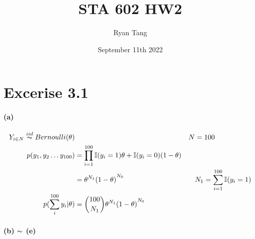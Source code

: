 \documentclass[11pt, letterpaper]{article}
\title{STA 602 HW2}
\author{Ryan Tang}
\date{September 11th 2022}
\begin{document}
\maketitle

\section{Excerise 3.1}
\paragraph{(a)}
\begin{align*}
    Y_{i\in N} \overset{iid}{\thicksim} Bernoulli(\theta) && N &= 100 \\
    p(y_1, y_2 \dots y_{100}) &= \prod_{i=1}^{100} \mathbb{I}(y_i=1)\theta + \mathbb{I}(y_i=0)(1-\theta) \\
        &= {\theta^{N_1}(1-\theta)}^{N_0} && N_1 = \sum_{i=1}^{100} \mathbb{I}(y_i=1) \\
    p(\sum_i^{100} y_i | \theta) &= \binom{100}{N_1} {\theta^{N_1}(1-\theta)}^{N_0}
\end{align*}

\paragraph{(b) $\thicksim$ (e)}
\end{document}
